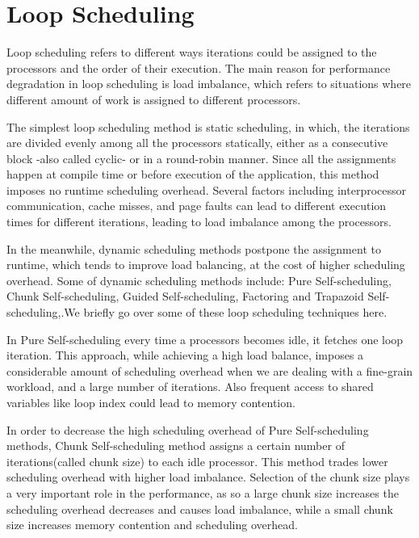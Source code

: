 \vspace{\baselineskip}
\section{Loop Scheduling}
Loop scheduling refers to different ways iterations could be assigned to the processors and the order of their execution. 
The main reason for performance degradation in loop scheduling is load imbalance, which refers to situations where different amount of work is assigned to different processors\cite{ciorba2018openmp}.    

The simplest loop scheduling method is static scheduling, in which, the iterations are divided evenly among all the processors statically, either as a consecutive block -also called cyclic- or in a round-robin manner\cite{liu1994safe}. Since all the assignments happen at compile time or before execution of the application, this method imposes no runtime scheduling overhead. Several factors including interprocessor communication, cache misses, and page faults can lead to different execution times for different iterations, leading to load imbalance among the processors\cite{philip1995increasing}.

In the meanwhile, dynamic scheduling methods postpone the assignment to runtime, which tends to improve load balancing, at the cost of higher scheduling overhead. Some of dynamic scheduling methods include: Pure Self-scheduling, Chunk Self-scheduling, Guided Self-scheduling\cite{polychronopoulos1987guided}, Factoring\cite{hummel1992factoring} and Trapazoid Self-scheduling\cite{tzen1993trapezoid},\cite{liu1994safe}.We briefly go over some of these loop scheduling techniques here.


In Pure Self-scheduling every time a processors becomes idle, it fetches one loop iteration. This approach, while achieving a high load balance, imposes a considerable amount of scheduling overhead when we are dealing with a fine-grain workload, and a large number of iterations. Also frequent access to shared variables like loop index could lead to memory contention\cite{liu1994safe}. 

In order to decrease the high scheduling overhead of Pure Self-scheduling methods, Chunk Self-scheduling method assigns a certain number of iterations(called chunk size) to each idle processor. This method trades lower scheduling overhead with higher load imbalance. Selection of the chunk size plays a very important role in the performance, as so a large chunk size increases the scheduling overhead decreases and causes load imbalance, while a small chunk size increases memory contention and scheduling overhead\cite{liu1994safe}. 

